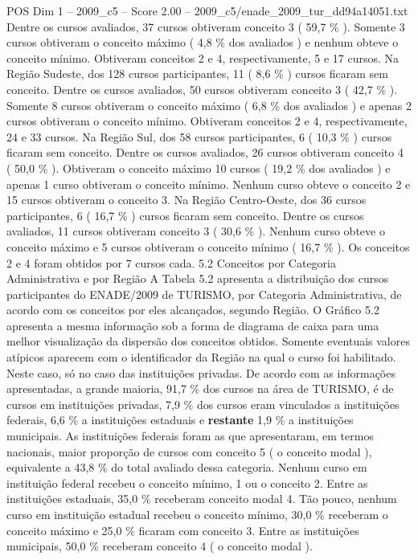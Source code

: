 \begin{textsample}{POS Dim 1 – 2009\_c5 – Score 2.00 – 2009\_c5/enade\_2009\_tur\_dd94a14051.txt}
Dentre os cursos avaliados, 37 cursos obtiveram conceito 3 ( 59,7 \% ).
Somente 3 cursos obtiveram o conceito máximo ( 4,8 \% dos avaliados ) e nenhum obteve o conceito mínimo.
Obtiveram conceitos 2 e 4, respectivamente, 5 e 17 cursos.
Na Região Sudeste, dos 128 cursos participantes, 11 ( 8,6 \% ) cursos ficaram sem conceito.
Dentre os cursos avaliados, 50 cursos obtiveram conceito 3 ( 42,7 \% ).
Somente 8 cursos obtiveram o conceito máximo ( 6,8 \% dos avaliados ) e apenas 2 cursos obtiveram o conceito mínimo.
Obtiveram conceitos 2 e 4, respectivamente, 24 e 33 cursos.
Na Região Sul, dos 58 cursos participantes, 6 ( 10,3 \% ) cursos ficaram sem conceito.
Dentre os cursos avaliados, 26 cursos obtiveram conceito 4 ( 50,0 \% ).
Obtiveram o conceito máximo 10 cursos ( 19,2 \% dos avaliados ) e apenas 1 curso obtiveram o conceito mínimo.
Nenhum curso obteve o conceito 2 e 15 cursos obtiveram o conceito 3.
Na Região Centro-Oeste, dos 36 cursos participantes, 6 ( 16,7 \% ) cursos ficaram sem conceito.
Dentre os cursos avaliados, 11 cursos obtiveram conceito 3 ( 30,6 \% ).
Nenhum curso obteve o conceito máximo e 5 cursos obtiveram o conceito mínimo ( 16,7 \% ).
Os conceitos 2 e 4 foram obtidos por 7 cursos cada. 5.2 Conceitos por Categoria Administrativa e por Região A Tabela 5.2 apresenta a distribuição dos cursos participantes do ENADE/2009 de TURISMO, por Categoria Administrativa, de acordo com os conceitos por eles alcançados, segundo Região.
O Gráfico 5.2 apresenta a mesma informação sob a forma de diagrama de caixa para uma melhor visualização da dispersão dos conceitos obtidos.
Somente eventuais valores atípicos aparecem com o identificador da Região na qual o curso foi habilitado.
Neste caso, só no caso das instituições privadas.
De acordo com as informações apresentadas, a grande maioria, 91,7 \% dos cursos na área de TURISMO, é de cursos em instituições privadas, 7,9 \% dos cursos eram vinculados a instituições federais, 6,6 \% a instituições estaduais e \textbf{restante} 1,9 \% a instituições municipais.
As instituições federais foram as que apresentaram, em termos nacionais, maior proporção de cursos com conceito 5 ( o conceito modal ), equivalente a 43,8 \% do total avaliado dessa categoria.
Nenhum curso em instituição federal recebeu o conceito mínimo, 1 ou o conceito 2.
Entre as instituições estaduais, 35,0 \% receberam conceito modal 4.
Tão pouco, nenhum curso em instituição estadual recebeu o conceito mínimo, 30,0 \% receberam o conceito máximo e 25,0 \% ficaram com conceito 3.
Entre as instituições municipais, 50,0 \% receberam conceito 4 ( o conceito modal ).

\end{textsample}
